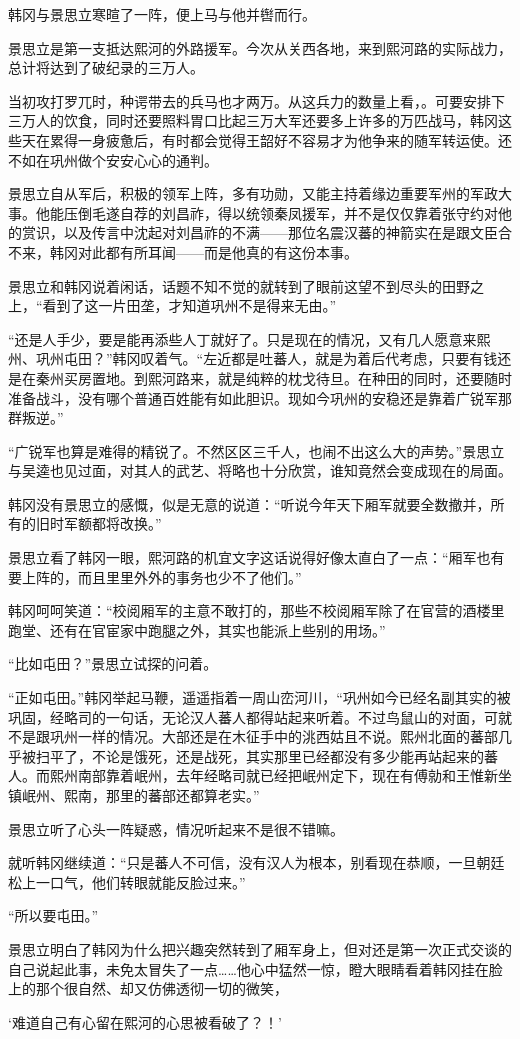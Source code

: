 韩冈与景思立寒暄了一阵，便上马与他并辔而行。

景思立是第一支抵达熙河的外路援军。今次从关西各地，来到熙河路的实际战力，总计将达到了破纪录的三万人。

当初攻打罗兀时，种谔带去的兵马也才两万。从这兵力的数量上看，。可要安排下三万人的饮食，同时还要照料胃口比起三万大军还要多上许多的万匹战马，韩冈这些天在累得一身疲惫后，有时都会觉得王韶好不容易才为他争来的随军转运使。还不如在巩州做个安安心心的通判。

景思立自从军后，积极的领军上阵，多有功勋，又能主持着缘边重要军州的军政大事。他能压倒毛遂自荐的刘昌祚，得以统领秦凤援军，并不是仅仅靠着张守约对他的赏识，以及传言中沈起对刘昌祚的不满——那位名震汉蕃的神箭实在是跟文臣合不来，韩冈对此都有所耳闻——而是他真的有这份本事。

景思立和韩冈说着闲话，话题不知不觉的就转到了眼前这望不到尽头的田野之上，“看到了这一片田垄，才知道巩州不是得来无由。”

“还是人手少，要是能再添些人丁就好了。只是现在的情况，又有几人愿意来熙州、巩州屯田？”韩冈叹着气。“左近都是吐蕃人，就是为着后代考虑，只要有钱还是在秦州买房置地。到熙河路来，就是纯粹的枕戈待旦。在种田的同时，还要随时准备战斗，没有哪个普通百姓能有如此胆识。现如今巩州的安稳还是靠着广锐军那群叛逆。”

“广锐军也算是难得的精锐了。不然区区三千人，也闹不出这么大的声势。”景思立与吴逵也见过面，对其人的武艺、将略也十分欣赏，谁知竟然会变成现在的局面。

韩冈没有景思立的感慨，似是无意的说道：“听说今年天下厢军就要全数撤并，所有的旧时军额都将改换。”

景思立看了韩冈一眼，熙河路的机宜文字这话说得好像太直白了一点：“厢军也有要上阵的，而且里里外外的事务也少不了他们。”

韩冈呵呵笑道：“校阅厢军的主意不敢打的，那些不校阅厢军除了在官营的酒楼里跑堂、还有在官宦家中跑腿之外，其实也能派上些别的用场。”

“比如屯田？”景思立试探的问着。

“正如屯田。”韩冈举起马鞭，遥遥指着一周山峦河川，“巩州如今已经名副其实的被巩固，经略司的一句话，无论汉人蕃人都得站起来听着。不过鸟鼠山的对面，可就不是跟巩州一样的情况。大部还是在木征手中的洮西姑且不说。熙州北面的蕃部几乎被扫平了，不论是饿死，还是战死，其实那里已经都没有多少能再站起来的蕃人。而熙州南部靠着岷州，去年经略司就已经把岷州定下，现在有傅勍和王惟新坐镇岷州、熙南，那里的蕃部还都算老实。”

景思立听了心头一阵疑惑，情况听起来不是很不错嘛。

就听韩冈继续道：“只是蕃人不可信，没有汉人为根本，别看现在恭顺，一旦朝廷松上一口气，他们转眼就能反脸过来。”

“所以要屯田。”

景思立明白了韩冈为什么把兴趣突然转到了厢军身上，但对还是第一次正式交谈的自己说起此事，未免太冒失了一点……他心中猛然一惊，瞪大眼睛看着韩冈挂在脸上的那个很自然、却又仿佛透彻一切的微笑，

‘难道自己有心留在熙河的心思被看破了？！’

